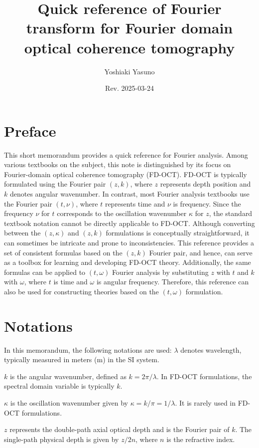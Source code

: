 \documentclass[a4paper]{article}
\title{Quick reference of Fourier transform for Fourier domain optical coherence tomography}
\author{Yoshiaki Yasuno}
\date{Rev. 2025-03-24}
\begin{document}
\maketitle
\tableofcontents

\section*{Preface}
This short memorandum provides a quick reference for Fourier analysis.
Among various textbooks on the subject, this note is distinguished by its focus on Fourier-domain optical coherence tomography (FD-OCT).
FD-OCT is typically formulated using the Fourier pair $(z, k)$, where $z$ represents depth position and $k$ denotes angular wavenumber.
In contrast, most Fourier analysis textbooks use the Fourier pair $(t,\nu)$, where $t$ represents time and $\nu$ is frequency.
Since the frequency $\nu$ for $t$ corresponds to the oscillation wavenumber $\kappa$ for $z$, the standard textbook notation cannot be directly applicable to FD-OCT.
Although converting between the $(z,\kappa)$ and $(z,k)$ formulations is conceptually straightforward, it can sometimes be intricate and prone to inconsistencies.
This reference provides a set of consistent formulas based on the $(z, k)$ Fourier pair, and hence, can serve as a toolbox for learning and developing FD-OCT theory.
Additionally, the same formulas can be applied to  $(t, \omega)$ Fourier analysis by substituting $z$ with $t$ and $k$ with $\omega$, where $t$ is time and $\omega$ is angular frequency.
Therefore, this reference can also be used for constructing theories based on the $(t, \omega)$ formulation.

\section{Notations}
In this memorandum, the following notations are used:
$\lambda$ denotes wavelength, typically measured in meters (m) in the SI system.

$k$ is the angular wavenumber, defined as $k = 2\pi/\lambda$.
In FD-OCT formulations, the spectral domain variable is typically $k$.

$\kappa$ is the oscillation wavenumber given by $\kappa = k/\pi= 1/\lambda$.
It is rarely used in FD-OCT formulations.

$z$ represents the double-path axial optical depth and is the Fourier pair of  $k$.
The single-path physical depth is given by $z/2n$, where $n$ is the refractive index.
\end{document}
